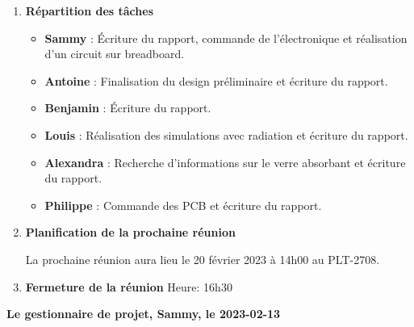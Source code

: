 \documentclass[12pt]{ULojpv}
\begin{document}
\begin{enumerate}
   \item \textbf{Répartition des tâches}
      \begin{itemize}
         \item \textbf{Sammy} : Écriture du rapport, commande de l'électronique et réalisation d'un circuit sur breadboard.
         \item \textbf{Antoine} : Finalisation du design préliminaire et écriture du rapport.
         \item \textbf{Benjamin} : Écriture du rapport.
         \item \textbf{Louis} : Réalisation des simulations avec radiation et écriture du rapport.
         \item \textbf{Alexandra} : Recherche d'informations sur le verre absorbant et écriture du rapport.
         \item \textbf{Philippe} : Commande des PCB et écriture du rapport.
      \end{itemize}
   
   \item \textbf{Planification de la prochaine réunion}
   
   La prochaine réunion aura lieu le 20 février 2023 à 14h00 au PLT-2708.

   \item \textbf{Fermeture de la réunion}
   Heure: 16h30
\end{enumerate}

\begin{flushright}
   \textbf{Le gestionnaire de projet, Sammy, le 2023-02-13}

\end{flushright}
\end{document}
